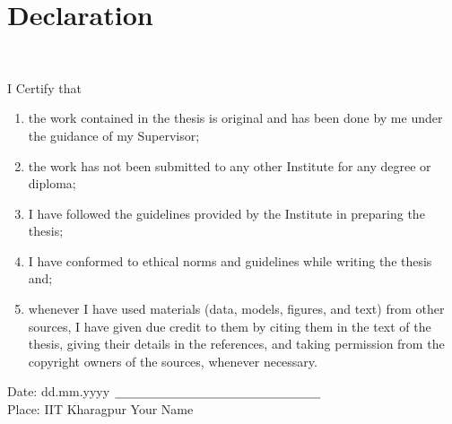 \chapter[Declaration]{Declaration}

\hspace{0pt plus 1filll} \\
{\sffamily
I Certify that

\begin{enumerate}[label=\alph*.,leftmargin=3\parindent]
	\item the work contained in the thesis is original and has been done by me under the guidance of my Supervisor;
	\item the work has not been submitted to any other Institute for any degree or diploma;
	\item I have followed the guidelines provided by the Institute in preparing the thesis;
	\item  I have conformed to ethical norms and guidelines while writing the thesis and;
	\item  whenever I have used materials (data, models, figures, and text) from other sources, I have given due credit to them by citing them in the text of the thesis, giving their details in the references, and taking permission from the copyright owners of the sources, whenever necessary.
\end{enumerate}
}
\vspace{2cm}

Date: dd.mm.yyyy \hspace{0pt plus 1filll} $\underline{\hspace{5.8cm}}$\\

Place: IIT Kharagpur \hspace{0pt plus 1filll} Your Name\\

